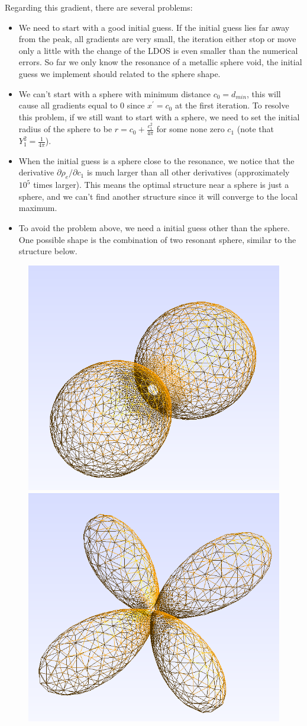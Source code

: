 \documentclass[12pt]{article}
\begin{document}
Regarding this gradient, there are several problems:
\begin{itemize}
\item We need to start with a good initial guess. If the initial guess lies far away from the peak, all gradients are very small, the iteration either stop or move only a little with the change of the LDOS is even smaller than the numerical errors. So far we only know the resonance of a metallic sphere void, the initial guess we implement should related to the sphere shape. 
\item We can't start with a sphere with minimum distance $c_0=d_{min}$, this will cause all gradients equal to 0 since $x^\prime=c_0$ at the first iteration. To resolve this problem, if we still want to start with a sphere, we need to set the initial radius of the sphere to be $r=c_0+\frac{c_1^2}{4\pi}$ for some none zero $c_1$ (note that $Y_1^2=\frac{1}{4\pi}$).
\item When the initial guess is a sphere close to the resonance, we notice that the derivative $\partial \rho_e/\partial c_1$ is much larger than all other derivatives (approximately $10^5$ times larger). This means the optimal structure near a sphere is just a sphere, and we can't find another structure since it will converge to the local maximum. 
\item To avoid the problem above, we need a initial guess other than the sphere. One possible shape is the combination of two resonant sphere, similar to the structure below.
\end{itemize}

\begin{figure}[H]
\centering
\includegraphics[width=0.45\linewidth]{shape1.png}
\includegraphics[width=0.45\linewidth]{shape2.png}
\end{figure}
%
\end{document}
